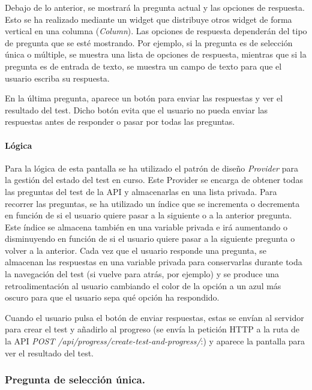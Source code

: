 Debajo de lo anterior, se mostrará la pregunta actual y las opciones de respuesta. Esto se ha realizado mediante un widget que distribuye
 otros widget de forma vertical en una columna (\textit{Column}). Las opciones de respuesta dependerán del tipo de pregunta que se esté mostrando. 
 Por ejemplo, si la pregunta es de selección única o múltiple, se muestra una lista de opciones de respuesta, mientras que si la pregunta es de entrada de texto,
  se muestra un campo de texto para que el usuario escriba su respuesta.

En la última pregunta, aparece un botón para enviar las respuestas y ver el resultado del test. 
Dicho botón evita que el usuario no pueda enviar las respuestas antes de responder o pasar por todas las preguntas.

\paragraph*{Lógica}
Para la lógica de esta pantalla se ha utilizado el patrón de diseño \textit{Provider} para la gestión del estado del test en curso.
Este Provider se encarga de obtener todas las preguntas del test de la API y almacenarlas en una lista privada.
 Para recorrer las preguntas, se ha utilizado un índice que se incrementa o decrementa en función de si el usuario quiere pasar a la siguiente o a la anterior pregunta. 
 Este índice se almacena también en una variable privada e irá aumentando o disminuyendo en función de si el usuario quiere pasar a la siguiente pregunta o volver a la anterior.
Cada vez que el usuario responde una pregunta, se almacenan las respuestas en una variable privada para conservarlas durante toda la navegación del test 
(si vuelve para atrás, por ejemplo) y se produce una retroalimentación al usuario cambiando el color de la opción a un azul más oscuro para que el usuario sepa qué opción ha respondido.

Cuando el usuario pulsa el botón de enviar respuestas, estas se envían al servidor para crear el test y añadirlo al progreso (se envía la petición HTTP
 a la ruta de la API \textit{POST /api/progress/create-test-and-progress/}:) y aparece la pantalla para ver el resultado del test.


\newpage 

\subsubsection{Pregunta de selección única.}\mbox{}\\

